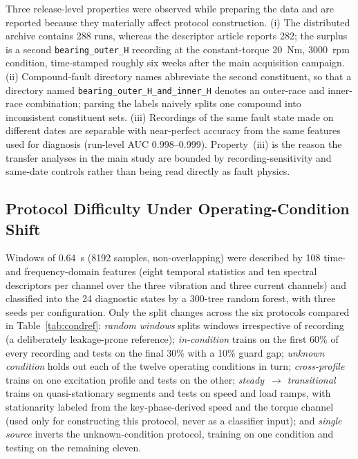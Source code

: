 Three release-level properties were observed while preparing the data and are
reported because they materially affect protocol construction. (i) The
distributed archive contains 288 runs, whereas the descriptor article
reports 282; the surplus is a second \texttt{bearing\_outer\_H} recording at
the constant-torque 20~Nm, 3000~rpm condition, time-stamped roughly six weeks
after the main acquisition campaign. (ii) Compound-fault directory names
abbreviate the second constituent, so that a directory named
\texttt{bearing\_outer\_H\_and\_inner\_H} denotes an outer-race and
inner-race combination; parsing the labels naively splits one compound into
inconsistent constituent sets. (iii) Recordings of the same fault state made
on different dates are separable with near-perfect accuracy from the same
features used for diagnosis (run-level AUC 0.998--0.999). Property~(iii) is
the reason the transfer analyses in the main study are bounded by
recording-sensitivity and same-date controls rather than being read directly
as fault physics.

\subsection{Protocol Difficulty Under Operating-Condition Shift}
\label{app:protocols}

Windows of 0.64~s (8192 samples, non-overlapping) were described by 108 time-
and frequency-domain features (eight temporal statistics and ten spectral
descriptors per channel over the three vibration and three current channels)
and classified into the 24 diagnostic states by a 300-tree random forest, with
three seeds per configuration. Only the split changes across the six
protocols compared in Table~\ref{tab:condref}: \emph{random windows} splits
windows irrespective of recording (a deliberately leakage-prone reference);
\emph{in-condition} trains on the first 60\% of every recording and tests on
the final 30\% with a 10\% guard gap; \emph{unknown condition} holds out each
of the twelve operating conditions in turn; \emph{cross-profile} trains on one
excitation profile and tests on the other; \emph{steady~$\rightarrow$
transitional} trains on quasi-stationary segments and tests on speed and load
ramps, with stationarity labeled from the key-phase-derived speed and the
torque channel (used only for constructing this protocol, never as a
classifier input); and \emph{single source} inverts the unknown-condition
protocol, training on one condition and testing on the remaining eleven.

